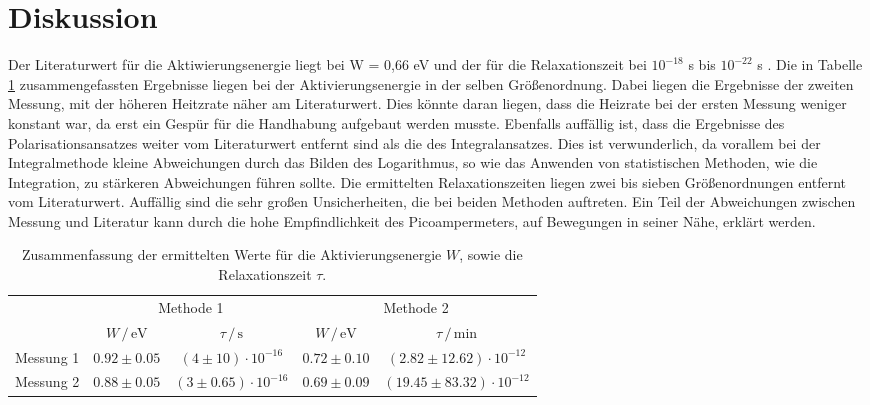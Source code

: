 \newpage
\section{Diskussion}
\label{sec:Diskussion}
Der Literaturwert für die Aktiwierungsenergie liegt bei W = 0,66 eV und der für die Relaxationszeit bei $10^{-18}$ s bis $10^{-22}$ s \cite{muccillo}.
Die in Tabelle \ref{tab:ergebnisse} zusammengefassten Ergebnisse liegen bei der Aktivierungsenergie in der selben Größenordnung.
Dabei liegen die Ergebnisse der zweiten Messung, mit der höheren Heitzrate näher am Literaturwert. 
Dies könnte daran liegen, dass die Heizrate bei der ersten Messung weniger konstant war, da erst ein Gespür für die Handhabung aufgebaut werden musste.
Ebenfalls auffällig ist, dass die Ergebnisse des Polarisationsansatzes weiter vom Literaturwert entfernt sind als die des Integralansatzes.
Dies ist verwunderlich, da vorallem bei der Integralmethode kleine Abweichungen durch das Bilden des Logarithmus, so wie das Anwenden von statistischen Methoden, wie die Integration, zu stärkeren Abweichungen führen sollte.
Die ermittelten Relaxationszeiten liegen zwei bis sieben Größenordnungen entfernt vom Literaturwert.
Auffällig sind die sehr großen Unsicherheiten, die bei beiden Methoden auftreten.
Ein Teil der Abweichungen zwischen Messung und Literatur kann durch die hohe Empfindlichkeit des Picoampermeters, auf Bewegungen in seiner Nähe, erklärt werden.


\begin{table}[h]
    \centering
    \caption{Zusammenfassung der ermittelten Werte für die Aktivierungsenergie $W$, sowie die Relaxationszeit $\tau$.}
    \label{tab:ergebnisse}
    \begin{tabular}{c c c c c}
      \toprule
      &\multicolumn{2}{c}{Methode 1} &\multicolumn{2}{c}{Methode 2}\\
      \cmidrule(lr){2-3}\cmidrule(lr){4-5}
                   &$W \, / \, \si{\electronvolt}$  &$\tau \, / \, \si{\second}$ & $W \, / \, \si{\electronvolt}$    & $\tau \, / \, \si{\minute}$   \\
      \midrule
      Messung 1    & $0.92 \pm 0.05$              & $(4 \pm 10) \cdot 10^{-16}$    & $0.72 \pm 0.10$                 & $(2.82 \pm 12.62) \cdot 10^{-12}$  \\   
      Messung 2    & $0.88 \pm 0.05$              & $(3 \pm 0.65) \cdot 10^{-16}$  & $0.69 \pm 0.09$                 & $(19.45 \pm 83.32) \cdot 10^{-12}$  \\   
      \bottomrule
    \end{tabular}
  \end{table}